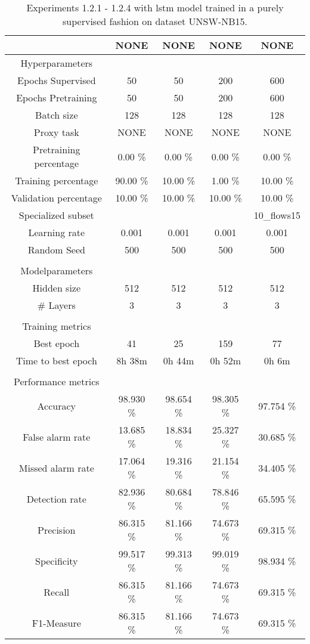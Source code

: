 \begin{table}[htb]
    \centering
    \begin{tabular}{@{}ccccc@{}}
        \toprule
         &  NONE &  NONE &  NONE &  NONE \\
        \midrule
        Hyperparameters &  &  &  &  \\
        Epochs Supervised &  50 &  50 &  200 &  600 \\
        Epochs Pretraining &  50 &  50 &  200 &  600 \\
        Batch size &  128 &  128 &  128 &  128 \\
        Proxy task &  NONE &  NONE &  NONE &  NONE \\
        Pretraining percentage &  0.00 \% &  0.00 \% &  0.00 \% &  0.00 \% \\
        Training percentage &  90.00 \% &  10.00 \% &  1.00 \% &  10.00 \% \\
        Validation percentage &  10.00 \% &  10.00 \% &  10.00 \% &  10.00 \% \\
        Specialized subset &   &   &   &  10\_flows15 \\
        Learning rate &  0.001 &  0.001 &  0.001 &  0.001 \\
        Random Seed &  500 &  500 &  500 &  500 \\
         \\
        Modelparameters &  &  &  &  \\
        Hidden size &  512 &  512 &  512 &  512 \\
        \# Layers &  3 &  3 &  3 &  3 \\
         \\
        Training metrics &  &  &  &  \\
        Best epoch &  41 &  25 &  159 &  77 \\
        Time to best epoch &  8h 38m &  0h 44m &  0h 52m &  0h 6m \\
         \\
        Performance metrics &  &  &  &  \\
        Accuracy &  98.930 \% &  98.654 \% &  98.305 \% &  97.754 \% \\
        False alarm rate &  13.685 \% &  18.834 \% &  25.327 \% &  30.685 \% \\
        Missed alarm rate &  17.064 \% &  19.316 \% &  21.154 \% &  34.405 \% \\
        Detection rate &  82.936 \% &  80.684 \% &  78.846 \% &  65.595 \% \\
        Precision &  86.315 \% &  81.166 \% &  74.673 \% &  69.315 \% \\
        Specificity &  99.517 \% &  99.313 \% &  99.019 \% &  98.934 \% \\
        Recall &  86.315 \% &  81.166 \% &  74.673 \% &  69.315 \% \\
        F1-Measure &  86.315 \% &  81.166 \% &  74.673 \% &  69.315 \% \\
        \bottomrule
    \end{tabular}
    \caption{Experiments 1.2.1 - 1.2.4 with \gls{lstm} model trained in a purely supervised fashion on dataset UNSW-NB15.}
    \label{table:results:lstm:flows15_supervised}
\end{table}